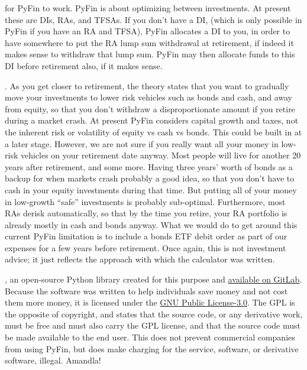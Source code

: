 \documentclass[a4paper, justified]{tufte-handout}
\begin{document}
 for PyFin to work. PyFin is about optimizing between investments. At present these are DIs, RAs, and TFSAs. If you don't have a DI, (which is only possible in PyFin if you have an RA and TFSA), PyFin allocates a DI to you, in order to have somewhere to put the RA lump sum withdrawal at retirement, if indeed it makes sense to withdraw that lump sum. PyFin may then allocate funds to this DI before retirement also, if it makes sense.

. As you get closer to retirement, the theory states that you want to gradually move your investments to lower risk vehicles such as bonds and cash, and away from equity, so that you don't withdraw a disproportionate amount if you retire during a market crash. At present PyFin considers capital growth and taxes, not the inherent risk or volatility of equity vs cash vs bonds. This could be built in at a later stage. However, we are not sure if you really want all your money in low-risk vehicles on your retirement date anyway. Most people will live for another 20 years after retirement, and some more. Having three years' worth of bonds as a backup for when markets crash probably a good idea, so that you don't have to cash in your equity investments during that time. But putting all of your money in low-growth ``safe'' investments is probably sub-optimal. Furthermore, most RAs derisk automatically, so that by the time you retire, your RA portfolio is already mostly in cash and bonds anyway. What we would do to get around this current PyFin limitation is to include a bonds ETF debit order as part of our expenses for a few years before retirement. Once again, this is not investment advice; it just reflects the approach with which the calculator was written.

, an open-source Python library created for this purpose and \href{https://gitlab.com/invokeanalytics/pyfin}{available on GitLab}. Because the software was written to help individuals save money and not cost them more money, it is licensed under the \href{https://opensource.org/licenses/GPL-3.0}{GNU Public License-3.0}. The GPL is the opposite of copyright, and states that the source code, or any derivative work, must be free and must also carry the GPL license, and that the source code must be made available to the end user. This does not prevent commercial companies from using PyFin, but does make charging for the service, software, or derivative software, illegal. Amandla!
\end{document}
